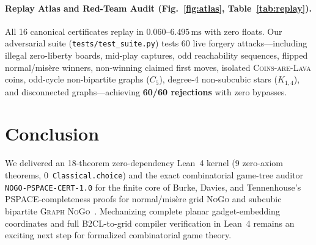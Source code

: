 \documentclass[11pt,twocolumn]{article}
\begin{document}
\paragraph{Replay Atlas and Red-Team Audit (Fig.~\ref{fig:atlas}, Table~\ref{tab:replay}).}
All 16 canonical certificates replay in $0.060$--$6.495\,\mathrm{ms}$ with zero floats. Our adversarial suite (\texttt{tests/test\_suite.py}) tests 60 live forgery attacks—including illegal zero-liberty boards, mid-play captures, odd reachability sequences, flipped normal/mis\`ere winners, non-winning claimed first moves, isolated \textsc{Coins-are-Lava} coins, odd-cycle non-bipartite graphs ($C_5$), degree-4 non-subcubic stars ($K_{1,4}$), and disconnected graphs—achieving \textbf{60/60 rejections} with zero bypasses.

\begin{table}[t]
\centering
\caption{Summary of all 16 canonical \texttt{NOGO-PSPACE-CERT-1.0} certificates and 60/60 live adversarial red-team audit.}
\label{tab:replay}
\end{table}

\section{Conclusion}
We delivered an 18-theorem zero-dependency Lean~4 kernel (9 zero-axiom theorems, 0~\texttt{Classical.choice}) and the exact combinatorial game-tree auditor \texttt{NOGO-PSPACE-CERT-1.0} for the finite core of Burke, Davies, and Tennenhouse's PSPACE-completeness proofs for normal/mis\`ere grid \textsc{NoGo} and subcubic bipartite \textsc{Graph NoGo}~\cite{burke2026nogo}. Mechanizing complete planar gadget-embedding coordinates and full B2CL-to-grid compiler verification in Lean~4 remains an exciting next step for formalized combinatorial game theory.



\end{document}
